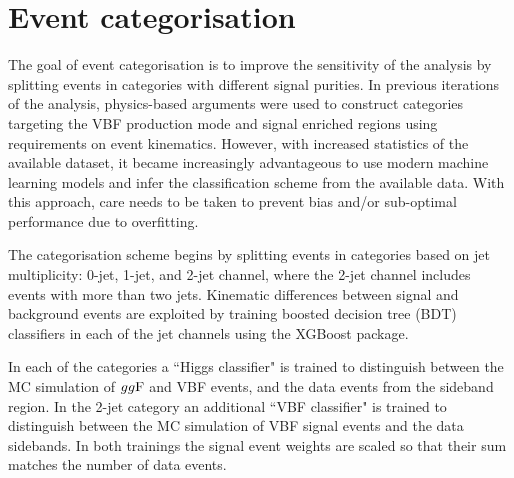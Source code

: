 \section{Event categorisation}

The goal of event categorisation is to improve the sensitivity of the
analysis by splitting events in categories with different signal
purities. In previous iterations of the analysis, physics-based
arguments were used to construct categories targeting the VBF 
production mode and signal enriched regions using requirements on
event kinematics. However, with increased statistics of the
available dataset, it became increasingly advantageous to use
modern machine learning models and infer the classification scheme
from the available data. With this approach, care needs to be taken
to prevent bias and/or sub-optimal performance due to overfitting.

The categorisation scheme begins by splitting events in categories
based on jet multiplicity: 0-jet, 1-jet, and 2-jet channel, where
the 2-jet channel includes events with more than two jets.
Kinematic differences between signal and background events are
exploited by training boosted decision tree (BDT) classifiers in
each of the jet channels using the XGBoost \cite{Chen:2016:XST:2939672.2939785}
package.

In each of the categories a ``Higgs classifier" is trained to
distinguish between the MC simulation of $gg\text{F}$ and VBF events, and the
data events from the sideband region. In the 2-jet
category an additional ``VBF classifier" is trained to distinguish
between the MC simulation of VBF signal events and the data sidebands.
In both trainings the signal event weights are scaled so that their sum
matches the number of data events. 

